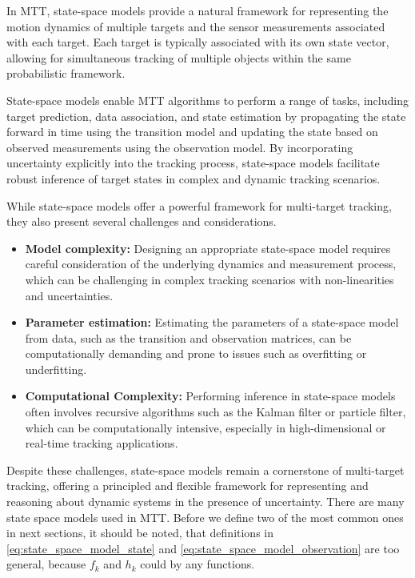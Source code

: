 In MTT, state-space models provide a natural framework for representing the motion dynamics of multiple targets and the sensor measurements associated with each target. Each target is typically associated with its own state vector, allowing for simultaneous tracking of multiple objects within the same probabilistic framework.

State-space models enable MTT algorithms to perform a range of tasks, including target prediction, data association, and state estimation by propagating the state forward in time using the transition model and updating the state based on observed measurements using the observation model. By incorporating uncertainty explicitly into the tracking process, state-space models facilitate robust inference of target states in complex and dynamic tracking scenarios.

While state-space models offer a powerful framework for multi-target tracking, they also present several challenges and considerations.
\begin{itemize}
    \item \textbf{Model complexity:} Designing an appropriate state-space model requires careful consideration of the
    underlying dynamics and measurement process, which can be challenging in complex tracking scenarios with non-linearities and uncertainties.
    \item \textbf{Parameter estimation:} Estimating the parameters of a state-space model from data, such as the transition and observation matrices, can be computationally demanding and prone to issues such as overfitting or underfitting.
    \item \textbf{Computational Complexity:} Performing inference in state-space models often involves recursive algorithms such as the Kalman filter or particle filter, which can be computationally intensive, especially in high-dimensional or real-time tracking applications.
\end{itemize}

Despite these challenges, state-space models remain a cornerstone of multi-target tracking, offering a principled and flexible framework for representing and reasoning about dynamic systems in the presence of uncertainty.
There are many state space models used in MTT. Before we define two of the most common ones in next sections, it
should be noted, that definitions in \eqref{eq:state_space_model_state} and \eqref{eq:state_space_model_observation} are too general, because $f_k$ and $h_k$ could by any functions.

